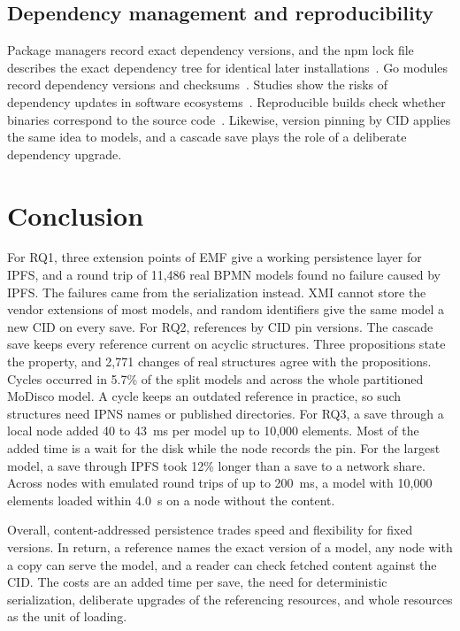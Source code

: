 \documentclass[5p,times,twocolumn]{elsarticle}
\theoremstyle{definition}
\theoremstyle{plain}
\begin{document}
\subsection{Dependency management and reproducibility}\label{sec:related-dependencies}

Package managers record exact dependency versions, and the npm lock file describes the exact dependency tree for identical later installations~\cite{npmpackagelock}. Go modules record dependency versions and checksums~\cite{gomodules}. Studies show the risks of dependency updates in software ecosystems~\cite{cox2019dependencies,decan2019ecosystems}. Reproducible builds check whether binaries correspond to the source code~\cite{lamb2022reproducible}. Likewise, version pinning by CID applies the same idea to models, and a cascade save plays the role of a deliberate dependency upgrade.

\section{Conclusion}\label{sec:conclusion}

For RQ1, three extension points of EMF give a working persistence layer for IPFS, and a round trip of 11,486 real BPMN models found no failure caused by IPFS. The failures came from the serialization instead. XMI cannot store the vendor extensions of most models, and random identifiers give the same model a new CID on every save. For RQ2, references by CID pin versions. The cascade save keeps every reference current on acyclic structures. Three propositions state the property, and 2,771 changes of real structures agree with the propositions. Cycles occurred in 5.7\% of the split models and across the whole partitioned MoDisco model. A cycle keeps an outdated reference in practice, so such structures need IPNS names or published directories. For RQ3, a save through a local node added 40 to 43~ms per model up to 10,000 elements. Most of the added time is a wait for the disk while the node records the pin. For the largest model, a save through IPFS took 12\% longer than a save to a network share. Across nodes with emulated round trips of up to 200~ms, a model with 10,000 elements loaded within 4.0~s on a node without the content.

Overall, content-addressed persistence trades speed and flexibility for fixed versions. In return, a reference names the exact version of a model, any node with a copy can serve the model, and a reader can check fetched content against the CID. The costs are an added time per save, the need for deterministic serialization, deliberate upgrades of the referencing resources, and whole resources as the unit of loading.
\end{document}

